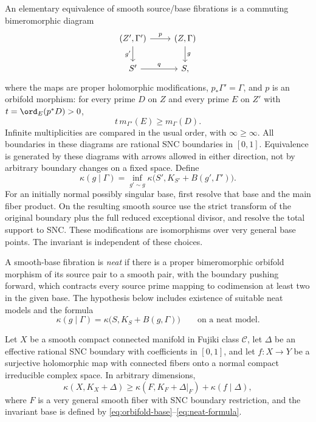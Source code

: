 An elementary equivalence of smooth source/base fibrations is a
commuting bimeromorphic diagram
\[
\begin{tikzcd}
 (Z',\Gamma')\arrow[r,"p"]\arrow[d,"g'"']&
 (Z,\Gamma)\arrow[d,"g"]\\
 S'\arrow[r,"q"]&S,
\end{tikzcd}
\]
where the maps are proper holomorphic modifications,
\(p_*\Gamma'=\Gamma\), and \(p\) is an orbifold morphism: for
every prime \(D\) on \(Z\) and every prime \(E\) on \(Z'\) with
\(t=\ord_E(p^*D)>0\),
\begin{equation}\label{eq:orbifold-morphism}
 t\,m_{\Gamma'}(E)\ge m_\Gamma(D).
\end{equation}
Infinite multiplicities are compared in the usual order, with
\(\infty\ge\infty\). All boundaries in these diagrams are rational
SNC boundaries in \([0,1]\). Equivalence is generated by these
diagrams with arrows allowed in either direction, not by arbitrary
boundary changes on a fixed space. Define
\begin{equation}\label{eq:orbifold-invariant}
 \kappa(g\mid\Gamma)=
 \inf_{g'\sim g}\kappa\bigl(S',K_{S'}+B(g',\Gamma')\bigr).
\end{equation}
For an initially normal possibly singular base, first resolve that
base and the main fiber product. On the resulting smooth source use
the strict transform of the original boundary plus the full reduced
exceptional divisor, and resolve the total support to SNC. These
modifications are isomorphisms over very general base points. The
invariant is independent of these choices.

A smooth-base fibration is \emph{neat} if there is a proper
bimeromorphic orbifold morphism of its source pair to a smooth pair,
with the boundary pushing forward, which contracts every source prime
mapping to codimension at least two in the given base. The hypothesis
below includes existence of suitable neat models and the formula
\begin{equation}\label{eq:neat-formula}
 \kappa(g\mid\Gamma)=\kappa\bigl(S,K_S+B(g,\Gamma)\bigr)
 \qquad\text{on a neat model}.
\end{equation}

\begin{assumption}
\label{hyp:campana}
Let \(X\) be a smooth compact connected manifold in Fujiki class
\(\mathcal C\), let \(\Delta\) be an effective rational SNC
boundary with coefficients in \([0,1]\), and let \(f:X\to Y\) be
a surjective holomorphic map with connected fibers onto a normal
compact irreducible complex space. In arbitrary dimensions,
\begin{equation}\label{eq:campana}
 \kappa(X,K_X+\Delta)\ge
 \kappa(F,K_F+\Delta|_F)+\kappa(f\mid\Delta),
\end{equation}
where \(F\) is a very general smooth fiber with SNC boundary
restriction, and the invariant base is defined by
\eqref{eq:orbifold-base}--\eqref{eq:neat-formula}.
\end{assumption}

